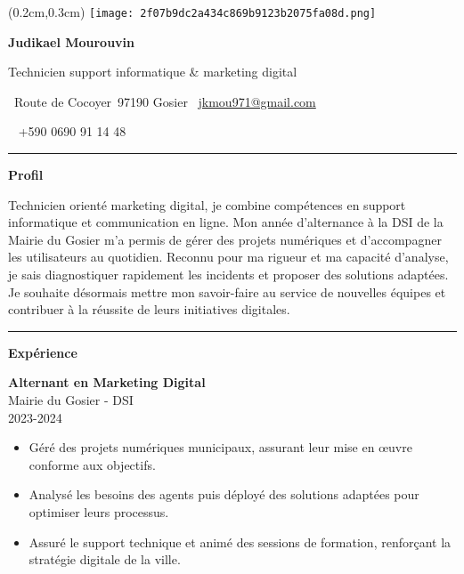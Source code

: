 \documentclass[a4paper]{article}
\renewcommand{\colorbox}[2]{#2}%
\newcommand{\fullrule}{\hspace{-1.5cm}\rule{\paperwidth}{0.4pt}}
\newcommand{\cvsection}[1]{%
  \vspace{6pt}\textbf{\Large #1}\par\vspace{2pt}}
\begin{document}
\color{white}
\begin{textblock*}{4cm}(0.2cm,0.3cm)
  \texttt{[image: 2f07b9dc2a434c869b9123b2075fa08d.png]}
\end{textblock*}

\begin{center}
  {\fontsize{44pt}{24pt}\selectfont\bfseries Judikael Mourouvin}

  \bigskip
  {\Large Technicien support informatique \& marketing digital}

  \bigskip\bigskip
  \faMapMarker~Route de Cocoyer\ 97190 Gosier
  \quad\faEnvelope~\href{mailto:jkmou971@gmail.com}{jkmou971@gmail.com}

  \bigskip
  \faPhone~ +590 0690 91 14 48
  \quad \faLinkedin\ \href{}{}
 

  \vspace{-0.3cm}
  \medskip\fullrule
\end{center}

\cvsection{Profil}

Technicien orienté marketing digital, je combine compétences en support informatique et communication en ligne. Mon année d’alternance à la DSI de la Mairie du Gosier m’a permis de gérer des projets numériques et d’accompagner les utilisateurs au quotidien. Reconnu pour ma rigueur et ma capacité d’analyse, je sais diagnostiquer rapidement les incidents et proposer des solutions adaptées. Je souhaite désormais mettre mon savoir-faire au service de nouvelles équipes et contribuer à la réussite de leurs initiatives digitales.

\medskip\fullrule

\cvsection{Expérience}
\hspace*{1.3cm}%

\colorbox{maincolor}{%
  \begin{minipage}{\linewidth}
    \textbf{Alternant en Marketing Digital} \\ Mairie du Gosier - DSI \\ 2023-2024
    \begin{itemize}
      \item Géré des projets numériques municipaux, assurant leur mise en œuvre conforme aux objectifs. \item Analysé les besoins des agents puis déployé des solutions adaptées pour optimiser leurs processus. \item Assuré le support technique et animé des sessions de formation, renforçant la stratégie digitale de la ville.
    \end{itemize}
  \end{minipage}}
\end{document}

